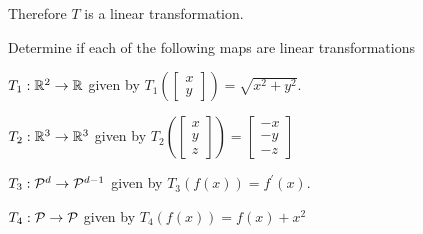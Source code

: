 \begin{applicationActivities}{1}{17}
\begin{example}
Therefore $T$ is a linear transformation.
\end{example}


\begin{activity}{15}
Determine if each of the following maps are linear transformations
\begin{subactivity}
$T_1: \IR^2 \rightarrow \IR$ given by $T_1 \left(\begin{bmatrix} x \\ y \end{bmatrix} \right) = \sqrt{x^2+y^2}$.
\end{subactivity}
\begin{subactivity}
$T_2: \IR^3 \rightarrow \IR^3 $ given by $T_2\left(\begin{bmatrix} x \\ y \\ z \end{bmatrix} \right)  = \begin{bmatrix} -x \\ -y \\ -z \end{bmatrix}$
\end{subactivity}
\begin{subactivity}
$T_3: \P^d \rightarrow \P^{d-1}$ given by $T_3(f(x)) = f^\prime(x)$.
\end{subactivity}
\begin{subactivity}
$T_4: \P \rightarrow \P$ given by $T_4(f(x)) = f(x)+x^2$
\end{subactivity}
\end{activity}


\end{applicationActivities}
